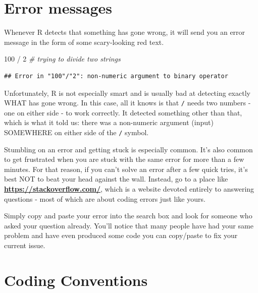 \documentclass[
]{book}
\newenvironment{Shaded}{\begin{snugshade}}{\end{snugshade}}
\newcommand{\CommentTok}[1]{\textcolor[rgb]{0.56,0.35,0.01}{\textit{#1}}}
\newcommand{\SpecialCharTok}[1]{\textcolor[rgb]{0.00,0.00,0.00}{#1}}
\newcommand{\StringTok}[1]{\textcolor[rgb]{0.31,0.60,0.02}{#1}}
\begin{document}
\hypertarget{error-messages}{%
\section{Error messages}\label{error-messages}}

Whenever R detects that something has gone wrong, it will send you an error message in the form of some scary-looking red text.

\begin{Shaded}
\begin{Highlighting}[]
\StringTok{\textquotesingle{}100\textquotesingle{}} \SpecialCharTok{/} \StringTok{\textquotesingle{}2\textquotesingle{}} \CommentTok{\# trying to divide two strings}
\end{Highlighting}
\end{Shaded}

\begin{verbatim}
## Error in "100"/"2": non-numeric argument to binary operator
\end{verbatim}

Unfortunately, R is not especially smart and is usually bad at detecting exactly WHAT has gone wrong. In this case, all it knows is that \texttt{/} needs two numbers - one on either side - to work correctly. It detected something other than that, which is what it told us: there was a non-numeric argument (input) SOMEWHERE on either side of the \texttt{/} symbol.

Stumbling on an error and getting stuck is especially common. It's also common to get frustrated when you are stuck with the same error for more than a few minutes. For that reason, if you can't solve an error after a few quick tries, it's best NOT to beat your head against the wall. Instead, go to a place like \href{https://stackoverflow.com/}{\textbf{https://stackoverflow.com/}}, which is a website devoted entirely to answering questions - most of which are about coding errors just like yours.

Simply copy and paste your error into the search box and look for someone who asked your question already. You'll notice that many people have had your same problem and have even produced some code you can copy/paste to fix your current issue.

\hypertarget{coding-conventions}{%
\section{Coding Conventions}\label{coding-conventions}}
\end{document}
